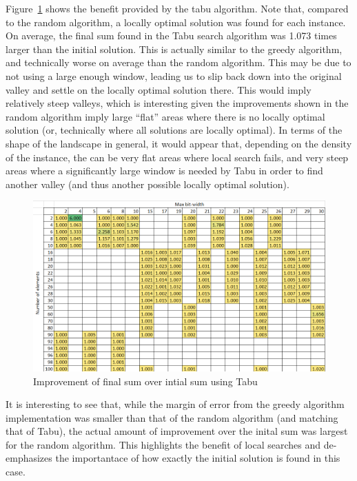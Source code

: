 \documentclass{report}
\begin{document}
Figure~\ref{fig:tabu_final_initial_compare} shows the benefit provided by the tabu algorithm.
Note that, compared to the random algorithm, a locally optimal solution was found for each instance. On average,
the final sum found in the Tabu search algorithm was 1.073 times larger than the initial solution. This is actually similar
to the greedy algorithm, and technically worse on average than the random algorithm. This may be due to not using
a large enough window, leading us to slip back down into the original valley and settle on the locally optimal solution there.
This would imply relatively steep valleys, which is interesting given the improvements shown in the random algorithm
imply large ``flat'' areas where there is no locally optimal solution (or, technically where all solutions are locally optimal).
In terms of the shape of the landscape in general, it would appear that, depending on the density of the instance,
the can be very flat areas where local search fails, and very steep areas where a significantly large window is needed
by Tabu in order to find another valley (and thus another possible locally optimal solution).

\begin{figure}[h]
  \centering
  \includegraphics[width=12cm]{p5_tabu_final_over_initial.png}
  \caption{Improvement of final sum over intial sum using Tabu}
  \label{fig:tabu_final_initial_compare}
\end{figure}

It is interesting to see that, while the margin of error from the greedy algorithm implementation was smaller than
that of the random algorithm (and matching that of Tabu), the actual amount of improvement over the inital sum was largest
for the random algorithm. This highlights the benefit of local searches and de-emphasizes the importantace of how exactly
the initial solution is found in this case. 
\end{document}
